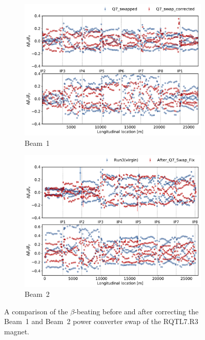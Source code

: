 \documentclass[a4paper]{cernatsnote}
\begin{document}
\begin{figure}[ht]
\begin{subfigure}{.5\textwidth}
  \centering
  \includegraphics[width=.99\linewidth]{plots/beam1/beta_beat_before_after_swap.pdf}  
  \caption{Beam~1}
\end{subfigure}
\begin{subfigure}{.5\textwidth}
  \centering
  \includegraphics[width=.99\linewidth]{plots/beam2/beta_beat_before_vs_after_Q7_swap.pdf}  
  \caption{Beam~2}
\end{subfigure}
\caption{A comparison of the $\beta$-beating before and after correcting the Beam~1 and Beam~2 power converter swap of the RQTL7.R3 magnet.}
\label{fig:before_after_swap}
\end{figure}
\end{document}
